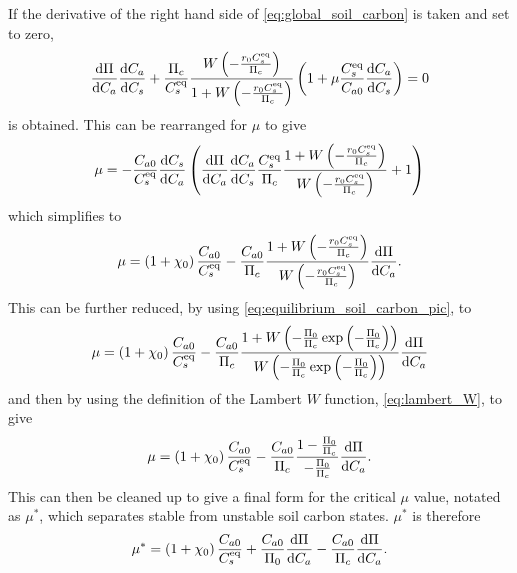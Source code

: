 If the derivative of the right hand side of \cref{eq:global_soil_carbon} is taken and set to zero, 
\begin{equation}
  \label{eq:soil_carbon_lambda}
  \dv{\Pi}{C_a}\dv{C_a}{C_s} + \frac{\Pi_c}{C_s^{\mathrm{eq}}} \frac{W\left(-\frac{r_0C_s^{\mathrm{eq}}}{\Pi_c}\right)}{1+W\left(-\frac{r_0C_s^{\mathrm{eq}}}{\Pi_c}\right)} \left(
    1 + \mu \frac{C_s^{\mathrm{eq}}}{C_{a0}} \dv{C_a}{C_s}\right) = 0
\end{equation}
is obtained. This can be rearranged for $\mu$ to give
\begin{equation}
  \label{eq:critical_mu}
  \mu = -\frac{C_{a0}}{C_{s}^{\mathrm{eq}}}\dv{C_s}{C_a}\left(\dv{\Pi}{C_a}\dv{C_a}{C_s} \frac{C_s^{\mathrm{eq}}}{\Pi_c}\frac{1+W\left(-\frac{r_0C_s^{\mathrm{eq}}}{\Pi_c}\right)}{W\left(-\frac{r_0C_s^{\mathrm{eq}}}{\Pi_c}\right)} + 1 \right)
\end{equation}
which simplifies to
\begin{equation}
  \label{eq:critical_mu_simple_ocean}
  \mu = \left(1+\chi_0\right) \frac{C_{a0}}{C_{s}^{\mathrm{eq}}} -
  \frac{C_{a0}}{\Pi_c}\frac{1+W\left(-\frac{r_0C_s^{\mathrm{eq}}}{\Pi_c}\right)}{W\left(-\frac{r_0C_s^{\mathrm{eq}}}{\Pi_c}\right)}\dv{\Pi}{C_a}.
\end{equation}
This can be further reduced, by using \cref{eq:equilibrium_soil_carbon_pic}, to
\begin{equation*}
  \mu = \left(1+\chi_0\right) \frac{C_{a0}}{C_{s}^{\mathrm{eq}}} -
  \frac{C_{a0}}{\Pi_c}
  \frac{1+W\left(-\frac{\Pi_0}{\Pi_c}\exp\left(-\frac{\Pi_0}{\Pi_c}\right)\right)}
  {W\left(-\frac{\Pi_0}{\Pi_c}\exp\left(-\frac{\Pi_0}{\Pi_c}\right)\right)}\dv{\Pi}{C_a} 
\end{equation*}
and then by using the definition of the Lambert $W$ function, \cref{eq:lambert_W}, to give
\begin{equation*}
  \mu = \left(1+\chi_0\right) \frac{C_{a0}}{C_{s}^{\mathrm{eq}}} -
  \frac{C_{a0}}{\Pi_c}
  \frac{1-\frac{\Pi_0}{\Pi_c}}{-\frac{\Pi_0}{\Pi_c}}\dv{\Pi}{C_a}.
\end{equation*}
This can then be cleaned up to give a final form for the critical $\mu$ value, notated as $\mu^*$, which separates stable from unstable soil
carbon states. $\mu^*$ is therefore
\begin{equation}
  \label{eq:critical_mu_simple_ocean_in_terms_of_npp}
  \mu^* = \left(1+\chi_0\right) \frac{C_{a0}}{C_{s}^{\mathrm{eq}}} +
  \frac{C_{a0}}{\Pi_0} \dv{\Pi}{C_a} - \frac{C_{a0}}{\Pi_c}\dv{\Pi}{C_a}.
\end{equation}
